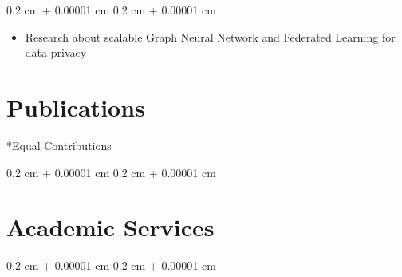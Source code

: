 \documentclass[10pt, letterpaper]{article}
\newenvironment{highlights}{
    \begin{itemize}[
        topsep=0.10 cm,
        parsep=0.10 cm,
        partopsep=0pt,
        itemsep=0pt,
        leftmargin=0.4 cm + 10pt
    ]
}{
    \end{itemize}
} %
\newenvironment{onecolentry}{
    \begin{adjustwidth}{
        0.2 cm + 0.00001 cm
    }{
        0.2 cm + 0.00001 cm
    }
}{
    \end{adjustwidth}
} %
\begin{document}
        \vspace{0.10 cm}
        \begin{onecolentry}
            \begin{highlights}
            \item {Research about scalable Graph Neural Network and Federated Learning for data privacy}
            \end{highlights}
        \end{onecolentry}
        \vspace{0.2 cm}

    \section{Publications}
    *Equal Contributions
    \begin{onecolentry}
    
    \end{onecolentry}

    \section{Academic Services}
    \begin{onecolentry}
    
    \end{onecolentry}
\end{document}

